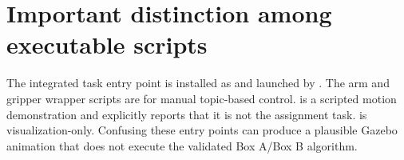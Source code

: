 \section{Important distinction among executable scripts}
The integrated task entry point is installed as  and
launched by . The arm and gripper wrapper scripts
are for manual topic-based control.  is a scripted
motion demonstration and explicitly reports that it is not the assignment
task.  is visualization-only. Confusing these entry
points can produce a plausible Gazebo animation that does not execute the
validated Box A/Box B algorithm.
